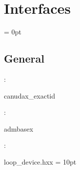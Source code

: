 
\section{Interfaces} 


\parskip = 0pt

\vspace{3mm} \subsection*{General}

: 

canudax\_exactid
\vspace{2mm}

: 

admbasex
\vspace{2mm}

\vspace{5mm}

: 

loop\_device.hxx
\vspace{2mm}\parskip = 10pt 
